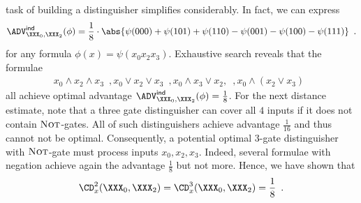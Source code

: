 \documentclass{crypto-exercise}
\begin{document}
\begin{solution}
task of building a distinguisher simplifies considerably. In fact, we can express
\begin{align*}
  \advINDXX{\XXX_0,\XXX_2}{\phi}
  =\frac{1}{8}\cdot\abs{\psi(000)+\psi(101)+\psi(110)
  -\psi(001)-\psi(100)-\psi(111)}\enspace.
\end{align*}
for any formula $\phi(x)=\psi(x_0x_2x_3)$. Exhaustive search reveals
that the formulae
\begin{align*}
    x_0\wedge x_2 \wedge x_3\enspace,
    x_0\vee x_2 \vee x_3\enspace,
    x_0\wedge x_3 \vee x_2,\enspace,
    x_0\wedge(x_2\vee x_3)\enspace   
\end{align*}
all achieve optimal advantage
$\advINDXX{\XXX_0,\XXX_2}{\phi}=\frac{1}{8}$. For the next distance
estimate, note that a three gate distinguisher can cover all $4$
inputs if it does not contain $\textsc{Not}$-gates. All of such
distinguishers achieve advantage $\frac{1}{16}$ and thus cannot not be
optimal. Consequently, a potential optimal $3$-gate distinguisher with
$\textsc{Not}$-gate must process inputs $x_0,x_2,x_3$. Indeed, several
formulae with negation achieve again the advantage $\frac{1}{8}$ but
not more. Hence, we have shown that
\begin{align*}
 \CD_x^2(\XXX_0,\XXX_2)=\CD_x^3(\XXX_0,\XXX_2)=\frac{1}{8}\enspace.
\end{align*}



\end{solution}
\end{document}
